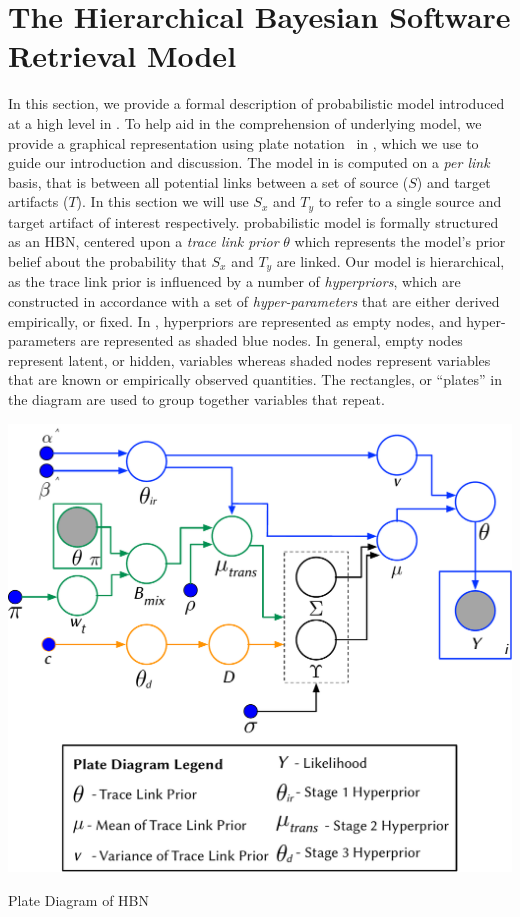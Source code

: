 \section{The Hierarchical Bayesian \hfill \break Software Retrieval Model}
\label{sec:approach-hbn}

In this section, we provide a formal description of \Comets probabilistic model introduced at a high level in . To help aid in the comprehension of \Comets underlying model, we provide a graphical representation using plate notation~\citep{Murphy:2012} in , which we use to guide our introduction and discussion. The model in  is computed on a \textit{per link} basis, that is between all potential links between a set of source ($S$) and target artifacts ($T$). In this section we will use $S_x$ and $T_y$ to refer to a single source and target artifact of interest respectively. \Comets probabilistic model is formally structured as an HBN, centered upon a \textit{trace link prior} $\theta$ which represents the model's prior belief about the probability that $S_x$ and $T_y$ are linked.  Our model is hierarchical, as the trace link prior is influenced by a number of \textit{hyperpriors}, which are constructed in accordance with a set of \textit{hyper-parameters} that are either derived empirically, or fixed. In , hyperpriors are represented as empty nodes, and hyper-parameters are represented as shaded blue nodes. In general, empty nodes represent latent, or hidden, variables whereas shaded nodes represent variables that are known or empirically observed quantities. The rectangles, or ``plates'' in the diagram are used to group together variables that repeat.

\begin{marginfigure}%

\centering
\includegraphics[width=\columnwidth]{graphics/chap_04-bayes/fig1_Model-Plate-Diagram.pdf}
\caption{Plate Diagram of \Comets HBN}
\label{fig:model-approachI}

\end{marginfigure}

